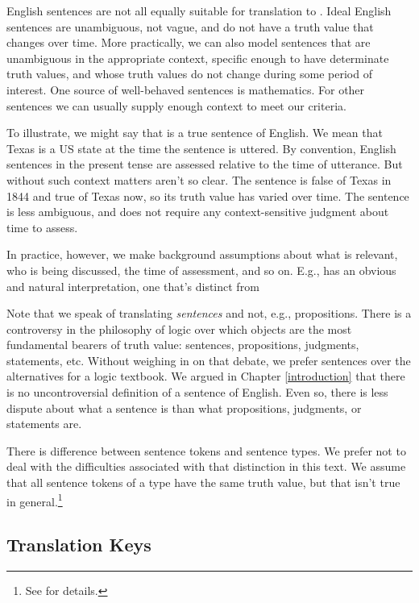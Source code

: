 English sentences are not all equally suitable for translation to \GQL{}.
Ideal English sentences are unambiguous, not vague, and do not have a truth value that changes over time.
More practically, we can also model sentences that are unambiguous in the appropriate context, specific enough to have determinate truth values, and whose truth values do not change during some period of interest.
One source of well-behaved sentences is mathematics.
For other sentences we can usually supply enough context to meet our criteria.

To illustrate, we might say that  is a true sentence of English.
We mean that Texas is a US state at the time the sentence is uttered.
By convention, English sentences in the present tense are assessed relative to the time of utterance.
But without such context matters aren't so clear.
The sentence is false of Texas in 1844 and true of Texas now, so its truth value has varied over time.
The sentence  is less ambiguous, and does not require any context-sensitive judgment about time to assess.

In practice, however, we make background assumptions about what is relevant, who is being discussed, the time of assessment, and so on.
E.g.,  has an obvious and natural interpretation, one that's distinct from 

Note that we speak of translating \emph{sentences} and not, e.g., propositions.
There is a controversy in the philosophy of logic over which objects are the most fundamental bearers of truth value: sentences, propositions, judgments, statements, etc.
Without weighing in on that debate, we prefer sentences over the alternatives for a logic textbook.
We argued in Chapter \ref{introduction} that there is no uncontroversial definition of a sentence of English.
Even so, there is less dispute about what a sentence is than what propositions, judgments, or statements are.

There is difference between sentence tokens and sentence types.
We prefer not to deal with the difficulties associated with that distinction in this text.
We assume that all sentence tokens of a type have the same truth value, but that isn't true in general.\footnote{
	See \citealt{Grandy1993} for details.
}

\subsection{\GSL{} Translation Keys}\label{GSLTranslationKeys}

